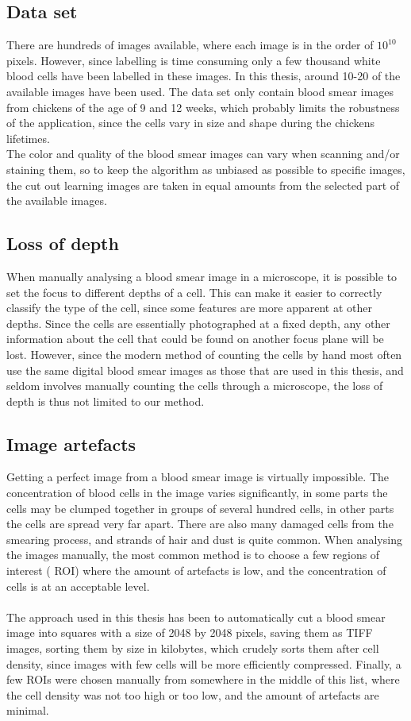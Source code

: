 \subsection{Data set}
There are hundreds of images available, where each image is in the order of $10^{10}$ pixels. However, since labelling is time consuming only a few thousand white blood cells have been labelled in these images. In this thesis, around 10-20 of the available images have been used. The data set only contain blood smear images from chickens of the age of 9 and 12 weeks, which probably limits the robustness of the application, since the cells vary in size and shape during the chickens lifetimes.\\
The color and quality of the blood smear images can vary when scanning and/or staining them, so to keep the algorithm as unbiased as possible to specific images, the cut out learning images are taken in equal amounts from the selected part of the available images.

\subsection{Loss of depth}
When manually analysing a blood smear image in a microscope, it is possible to set the focus to different depths of a cell. This can make it easier to correctly classify the type of the cell, since some features are more apparent at other depths. Since the cells are essentially photographed at a fixed depth, any other information about the cell that could be found on another focus plane will be lost.
However, since the modern method of counting the cells by hand most often use the same digital blood smear images as those that are used in this thesis, and seldom involves manually counting the cells through a microscope, the loss of depth is thus not limited to our method.

\subsection{Image artefacts}
Getting a perfect image from a blood smear image is virtually impossible. The concentration of blood cells in the image varies significantly, in some parts the cells may be clumped together in groups of several hundred cells, in other parts the cells are spread very far apart. There are also many damaged cells from the smearing process, and strands of hair and dust is quite common. When analysing the images manually, the most common method is to choose a few regions of interest ( ROI) where the amount of artefacts is low, and the concentration of cells is at an acceptable level.\\\\
The approach used in this thesis has been to automatically cut a blood smear image into squares with a size of 2048 by 2048 pixels, saving them as TIFF images, sorting them by size in kilobytes, which crudely sorts them after cell density, since images with few cells will be more efficiently compressed. Finally, a few ROIs were chosen manually from somewhere in the middle of this list, where the cell density was not too high or too low, and the amount of artefacts are minimal.

